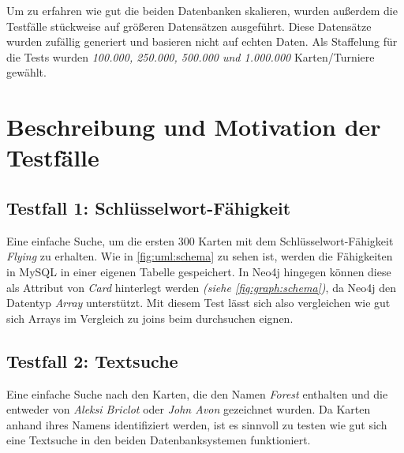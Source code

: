 Um zu erfahren wie gut die beiden Datenbanken skalieren, wurden außerdem die Testfälle stückweise auf größeren Datensätzen ausgeführt. Diese Datensätze wurden zufällig generiert und basieren nicht auf echten Daten. Als Staffelung für die Tests wurden \emph{100.000, 250.000, 500.000 und 1.000.000} Karten/Turniere gewählt.

\section{Beschreibung und Motivation der Testfälle}





\subsection{Testfall 1: Schlüsselwort-Fähigkeit}
Eine einfache Suche, um die ersten 300 Karten mit dem Schlüsselwort-Fähigkeit \emph{Flying} zu erhalten. Wie in \autoref{fig:uml:schema} zu sehen ist, werden die Fähigkeiten in MySQL in einer eigenen Tabelle gespeichert. In Neo4j hingegen können diese als Attribut von \emph{Card} hinterlegt werden \emph{(siehe \autoref{fig:graph:schema})}, da Neo4j den Datentyp \emph{Array} unterstützt. Mit diesem Test lässt sich also vergleichen wie gut sich Arrays im Vergleich zu joins beim durchsuchen eignen.
    
\subsection{Testfall 2: Textsuche}
Eine einfache Suche nach den Karten, die den Namen \emph{Forest} enthalten und die entweder von \emph{Aleksi Briclot} oder \emph{John Avon} gezeichnet wurden. Da Karten anhand ihres Namens identifiziert werden, ist es sinnvoll zu testen wie gut sich eine Textsuche in den beiden Datenbanksystemen funktioniert.

